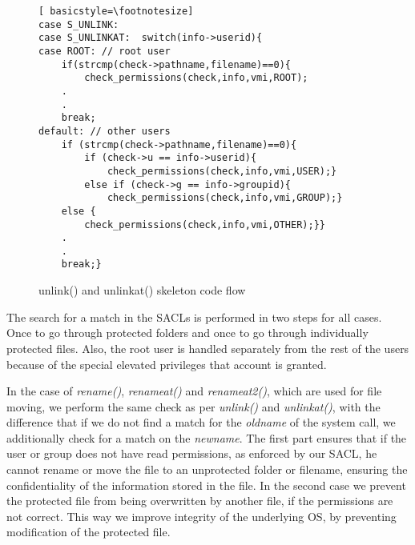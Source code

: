 \begin{figure}[ht]
	\centering
	\begin{lstlisting}[ basicstyle=\footnotesize]
case S_UNLINK:          
case S_UNLINKAT:  switch(info->userid){
case ROOT: // root user
	if(strcmp(check->pathname,filename)==0){
		check_permissions(check,info,vmi,ROOT);			
	.
	.
	break;
default: // other users
	if (strcmp(check->pathname,filename)==0){
		if (check->u == info->userid){
			check_permissions(check,info,vmi,USER);}
		else if (check->g == info->groupid){
			check_permissions(check,info,vmi,GROUP);}
	else {
		check_permissions(check,info,vmi,OTHER);}}
	.
	.
	break;}
	\end{lstlisting}
	\caption{unlink() and unlinkat() skeleton code flow}
	\label{fig:unlink}
\end{figure}

\par The search for a match in the \ac{SACL}s is performed in two steps for all cases. Once to go through protected folders and once to go through individually protected files. Also, the root user is handled separately from the rest of the users because of the special elevated privileges that account is granted. 

\par In the case of \textit{rename()}, \textit{renameat()} and \textit{renameat2()}, which are used for file moving, we perform the same check as per \textit{unlink()} and \textit{unlinkat()}, with the difference that if we do not find a match for the \textit{oldname} of the system call, we additionally check for a match on the \textit{newname}. The first part ensures that if the user or group does not have read permissions, as enforced by our \ac{SACL}, he cannot rename or move the file to an unprotected folder or filename, ensuring the confidentiality of the information stored in the file. In the second case we prevent the protected file from being overwritten by another file, if the permissions are not correct. This way we improve integrity of the underlying \ac{OS}, by preventing modification of the protected file. 

